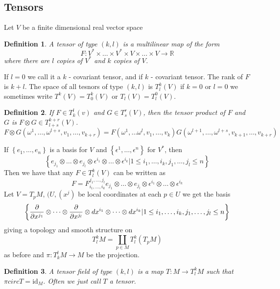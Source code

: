 \documentclass[a4paper]{article}
\newtheorem*{defn}{Definition}
\begin{document}
\subsection*{Tensors}%
Let $V$ be a finite dimensional real vector space

\begin{defn}
  A tensor of type $(k,l)$ is a multilinear map of the form 
  \[
    F: V^* \times \dots \times V^* \times V \times \dots \times V \rightarrow \mathds{R}
  \]
  where there are $l$ copies of $V^*$ and $k$ copies of $V$.
\end{defn}
If $l = 0$ we call it a $k$ - covariant tensor, and if $k$ - covariant tensor. The rank of $F$ is $k + l$. The space of all tesnors of type $(k,l)$ is $T^k_l(V)$ if $k=0$ or $l=0$ we sometimes write $T^k(V) = T^k_0(V)$ or $T_l(V) = T_l^0(V)$.

\begin{defn}
  If $F \in T_k^l(v)$ and $G \in T_s^r(V)$, then the tensor product of $F$ and $G$ is $F \otimes G \in T_{l + s}^{k+r}(V)$.
  \[
    F \otimes G(\omega^1, \dots, \omega^{l+s}, v_1, \dots, v_{k+r}) = F(\omega^1, \dots \omega^l, v_1, \dots, v_k)G(\omega^{l+1}, \dots, \omega^{l+s}, v_{k+1}, \dots, v_{k+r})
  \]
\end{defn}

If $\left\{ e_1, \dots, e_n \right\}$ is a basis for $V$ and $\left\{ \epsilon^1, \dots, \epsilon^n \right\}$ for $V^*$, then
\[
  \left\{ e_{j_1} \otimes \dots \otimes e_{j_l} \otimes \epsilon^{i_1} \otimes \dots \otimes \epsilon^{i_k} | 1 \leq i_1, \dots, i_k, j_1, \dots, j_l \leq n \right\}
\]
Then we have that any $F \in T_l^k(V)$ can be written as
\[
  F = F^{j_1, \dots, j_l}_{i_1, \dots, i_k} e_{j_1} \otimes \dots \otimes e_{j_l} \otimes \epsilon^{i_1} \otimes \dots \otimes \epsilon^{i_k}
\]
Let $V = T_pM$, $(U, (x^j)$ be local coordinates at each $p \in U$ we get the basis
\[
  \left\{ \pdv{x^{j_1}} \otimes \dots \otimes \pdv{x^{j_l}} \otimes dx^{i_1} \otimes \dots \otimes dx^{i_k} | 1 \leq i_1, \dots, i_k, j_1, \dots, j_l \leq n \right\}
\]
giving a topology and smooth structure on
\[
  T_l^kM = \coprod_{p \in M} T_l^k (T_pM)
\]
as before and $\pi:T_k^lM \rightarrow M$ be the projection.

\begin{defn}
  A tensor field of type $(k,l)$ is a map $T: M \rightarrow T_l^kM$ such that $\pi circ T = \text{id}_M$. Often we just call $T$ a tensor. 
\end{defn}
\end{document}
